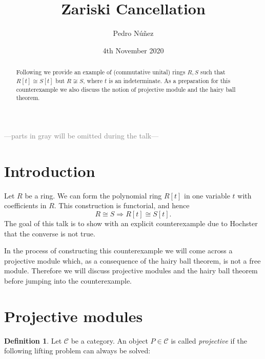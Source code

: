 \documentclass[A4paper, 12pt, british, reqno]{amsart}
\author{Pedro N\'{u}\~{n}ez}
\title[Zariski Cancellation]{Zariski Cancellation}
\date{4th November 2020}
\newcommand{\calC}{\mathcal{C}}
\theoremstyle{plain}
\theoremstyle{definition}
\newtheorem{defn}[thm]{Definition}
\theoremstyle{remark}
\theoremstyle{plain}
\theoremstyle{definition}
\theoremstyle{remark}
\theoremstyle{plain}
\theoremstyle{definition}
\theoremstyle{remark}
\begin{document}

\maketitle

\begin{abstract}
    Following \cite{hoc72} we provide an example of (commutative unital) rings $R,S$ such that $R[t]\cong S[t]$ but $R\not\cong S$, where $t$ is an indeterminate.
    As a preparation for this counterexample we also discuss the notion of projective module and the hairy ball theorem.	
\end{abstract}

\tableofcontents

\begin{center}
    \textcolor{gray}{---parts in gray will be omitted during the talk---}
\end{center}

\section{Introduction}

Let $R$ be a ring.
We can form the polynomial ring $R[t]$ in one variable $t$ with coefficients in $R$.
This construction is functorial, and hence
\[ R\cong S \Rightarrow R[t]\cong S[t]. \]
The goal of this talk is to show with an explicit counterexample due to Hochster \cite{hoc72} that the converse is not true.

In the process of constructing this counterexample we will come across a projective module which, as a consequence of the hairy ball theorem, is not a free module.
Therefore we will discuss projective modules and the hairy ball theorem before jumping into the counterexample.

\section{Projective modules}

\begin{defn}
    Let $\calC$ be a category.
    An object $P\in \calC$ is called \textit{projective} if the following lifting problem can always be solved:
    
    \begin{center}
    \end{center}
\end{defn}
\end{document}
